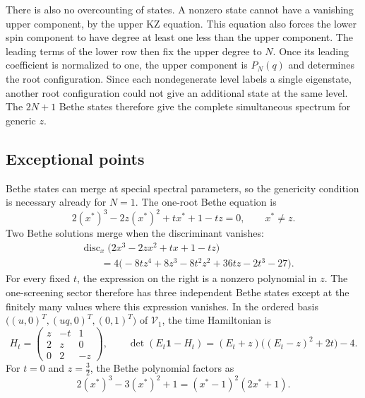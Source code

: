 \documentclass[a4paper,11pt]{article}
\numberwithin{equation}{section}
\begin{document}
There is also no overcounting of states.  A nonzero state cannot
have a vanishing upper component, by the upper KZ equation.  This
equation also forces
the lower spin component to have degree at least one less than the
upper component.  The leading terms of the lower row then fix the
upper degree to $N$.  Once its leading coefficient is normalized
to one, the upper component is $P_{N}(q)$ and determines the root
configuration.  Since each nondegenerate level labels a single
eigenstate, another root configuration could not give an additional
state at the same level.  The $2N+1$ Bethe states therefore give
the complete simultaneous spectrum for generic $z$.

\subsection{Exceptional points}
\label{appendix:PII Bethe exceptional points}
Bethe states can merge at special spectral parameters, so the
genericity condition is necessary already for $N=1$.  The one-root Bethe equation is
\begin{equation}
	2(x^{*})^{3}-2z(x^{*})^{2}+tx^{*}+1-tz=0,
	\qquad x^{*}\neq z.
\end{equation}
Two Bethe solutions merge when the discriminant vanishes:
\begin{equation}
	\begin{aligned}
		&\operatorname{disc}_{x}
		\bigl(2x^{3}-2zx^{2}+tx+1-tz\bigr)\\
		&\qquad=4\bigl(-8tz^{4}+8z^{3}-8t^{2}z^{2}
		+36tz-2t^{3}-27\bigr).
	\end{aligned}
\end{equation}
For every fixed $t$, the expression on the right is a nonzero
polynomial in $z$.  The one-screening sector therefore has three
independent Bethe states except at the finitely many values where
this expression vanishes.
In the ordered basis
$\bigl((u,0)^{T},(uq,0)^{T},(0,1)^{T}\bigr)$ of
$\mathcal{V}_{1}$, the time Hamiltonian is
\begin{equation}
	H_{t}=\begin{pmatrix}
		z&-t&1\\
		2&z&0\\
		0&2&-z
	\end{pmatrix},
	\qquad
	\det(E_{t}\mathbf{1}-H_{t})
	=(E_{t}+z)\bigl((E_{t}-z)^{2}+2t\bigr)-4.
\end{equation}
For $t=0$ and $z=\frac{3}{2}$, the Bethe polynomial factors as
\begin{equation}
	2(x^{*})^{3}-3(x^{*})^{2}+1
	=(x^{*}-1)^{2}(2x^{*}+1).
\end{equation}
\end{document}
